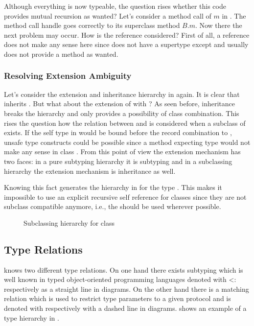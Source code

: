 Although everything is now typeable, the question rises whether this
code provides mutual recursion as wanted?  Let's consider a method call
of $m$ in \C. The method call handle goes correctly to its superclass
method $B.m$. Now there the next problem may occur. How is the \base
reference considered?  First of all, a \base reference does not make
any sense here since \C does not have a supertype except \object and
\object usually does not provide a method as wanted.

\subsubsection{Resolving Extension Ambiguity}
\label{sec:resolveAmbiguity}
Let's consider the extension and inheritance hierarchy in 
again. It is clear that \C inherits \B. But what about the extension of \A 
with \B? As seen before, inheritance breaks the hierarchy and only
provides a possibility of class combination. This rises the question how the 
relation between \A and \B is considered when a subclass of \B exists. If
the self type in \A would be bound before the record combination to
\C, unsafe type constructs could be possible since a
method expecting type \A would not make any sense in class \C. From this
point of view the extension mechanism has two faces: in a pure
subtyping hierarchy it is subtyping and in a subclassing hierarchy the
extension mechanism is inheritance as well.

Knowing this fact generates the hierarchy in 
for the type \C. This makes it impossible to use an explicit recursive
self reference for classes since they are not subclass compatible anymore,
i.e., the \mytype should be used wherever possible.

\begin{figure}[ht]
	\centering
	\caption{Subclassing hierarchy for class \C}
	\label{fig:fixedHierarchy}
\end{figure}
%

\subsection{Type Relations}
\ooplss knows two different type relations. On one hand there exists
subtyping which is well known in typed object-oriented programming
languages denoted with <: respectively as a straight line in diagrams. On
the other hand there is a matching relation which is used to restrict type
parameters to a given protocol and is denoted with \match respectively
with a dashed line in diagrams.  shows an example
of a type hierarchy in \ooplss.

